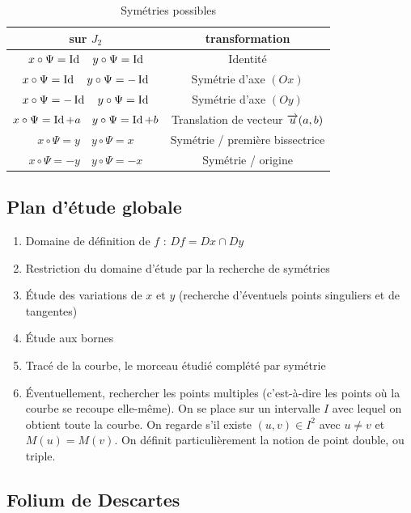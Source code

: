 \begin{table}
  \centering
  \begin{tabular}{|c|c|} \hline
    sur \( J_2\) & transformation \\ \hline
    \(x \circ \Psi = \operatorname{Id} \quad y \circ \Psi = \operatorname{Id}\) &Identité \\ \hline
    \(x \circ \Psi = \operatorname{Id} \quad y \circ \Psi = -\operatorname{Id}\) &Symétrie d'axe \((Ox)\) \\
    \hline
    \(x \circ \Psi = -\operatorname{Id} \quad y \circ \Psi = \operatorname{Id}\) &Symétrie d'axe \((Oy)\) \\
    \hline
    \(x \circ \Psi = \operatorname{Id} + a \quad y \circ \Psi = \operatorname{Id} + b\) & Translation de
    vecteur \(\overrightarrow{u}(a, b)\)\\ \hline
    \(x \circ \Psi = y \quad y \circ \Psi = x\) & Symétrie / première
    bissectrice\\ \hline
    \(x \circ \Psi = -y \quad y \circ \Psi = -x\) & Symétrie / origine\\ \hline
  \end{tabular}
  \caption{Symétries possibles}
  \label{tab:sym}
\end{table}

\subsection{Plan d'étude globale}

\begin{enumerate}
  \item Domaine de définition de \(f\) : \(Df = Dx \cap Dy\)
  \item Restriction du domaine d'étude par la recherche de symétries
  \item Étude des variations de \(x\) et \(y\) (recherche d'éventuels points
    singuliers et de tangentes)
  \item Étude aux bornes
  \item Tracé de la courbe, le morceau étudié complété par symétrie
  \item Éventuellement, rechercher les points multiples (c'est-à-dire les points
    où la courbe se recoupe elle-même). On se place sur un intervalle \(I\) avec
    lequel on obtient toute la courbe. On regarde s'il existe \((u, v) \in I^2\)
    avec \(u \neq v\) et \(M(u)=M(v)\). On définit particulièrement la notion de
    point double, ou triple.
\end{enumerate}

\subsection{Folium de Descartes}


